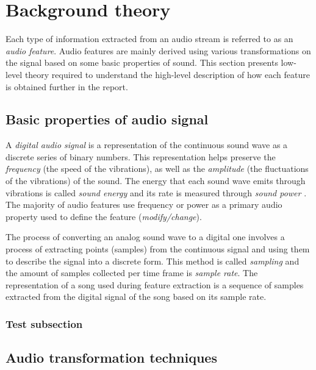 
\chapter{Background theory}
\label{chap:relatedterms}
\ifpdf
    \graphicspath{{RelatedTerminology/Figures/PNG/}{RelatedTerminology/Figures/PDF/}{RelatedTerminology/Figures/}}
\else
    \graphicspath{{RelatedTerminology/Figures/EPS/}{RelatedTerminology/Figures/}}
\fi



%

Each type of information extracted from an audio stream is referred to as an
\textit{audio feature}. Audio features are mainly derived using various 
transformations on the signal based on some basic properties of sound. This
section presents low-level theory required to understand the high-level
description of how each feature is obtained further in the report.


\section{Basic properties of audio signal}
\label{sec:audioprops}
A \textit{digital audio signal} is a representation of the continuous sound
wave as a discrete series of binary numbers. This
representation helps preserve the \textit{frequency} (the speed of the
vibrations), as well as the \textit{amplitude} (the fluctuations of the
vibrations) of the sound. The energy that each sound wave emits through
vibrations is called \textit{sound energy} and its rate is measured through
\textit{sound power} \cite{acoustic-glossary-power}. The majority of audio
features use frequency or power as a primary audio property used to define the
feature (\textit{modify/change}).

The process of converting an analog sound wave to a digital one involves a
process of extracting points (samples) from the continuous signal and using them
to describe the signal into a discrete form. This method is called
\textit{sampling} and the amount of samples collected per time frame is
\textit{sample rate}. The representation of a song used during feature
extraction is a sequence of samples extracted from the digital signal of the
song based on its sample rate.
\subsection{Test subsection}
\label{sec:subsec21}

\section{Audio transformation techniques}
\label{sec:audiotransform}
